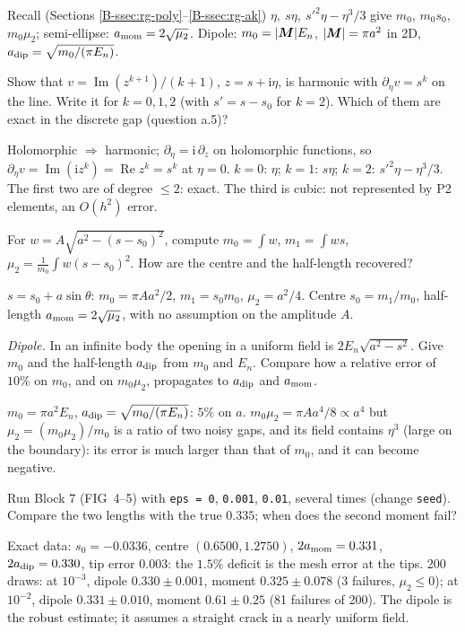 \begin{gbox}{Recall (Sections \ref{B-ssec:rg-poly}--\ref{B-ssec:rg-ak})}
$\eta,\ s\eta,\ s'^2\eta-\eta^3/3$ give $m_0$, $m_0s_0$, $m_0\mu_2$; semi-ellipse:
$a_{\rm mom}=2\sqrt{\mu_2}$. Dipole: $m_0=|\bm{M}|E_n$, $|\bm{M}|=\pi a^2$ in 2D,
$a_{\rm dip}=\sqrt{m_0/(\pi E_n)}$.
\end{gbox}

\q Show that $v=\operatorname{Im}(z^{k+1})/(k+1)$, $z=s+\mathrm i\eta$, is
harmonic with $\partial_\eta v=s^k$ on the line. Write it for $k=0,1,2$
(with $s'=s-s_0$ for $k=2$). Which of them are exact in the discrete gap
(question a.5)?
\begin{answer}
Holomorphic $\Rightarrow$ harmonic; $\partial_\eta=\mathrm i\,\partial_z$ on
holomorphic functions, so $\partial_\eta v=\operatorname{Im}(\mathrm i z^k)=
\operatorname{Re}z^k=s^k$ at $\eta=0$. $k=0$: $\eta$; $k=1$: $s\eta$; $k=2$:
$s'^2\eta-\eta^3/3$. The first two are of degree $\le2$: exact. The third
is cubic: not represented by P2 elements, an $O(h^2)$ error.
\end{answer}

\q For $w=A\sqrt{a^2-(s-s_0)^2}$, compute $m_0=\int w$, $m_1=\int ws$,
$\mu_2=\frac1{m_0}\int w(s-s_0)^2$. How are the centre and the half-length
recovered?
\begin{answer}
$s=s_0+a\sin\theta$: $m_0=\pi Aa^2/2$, $m_1=s_0m_0$, $\mu_2=a^2/4$. Centre
$s_0=m_1/m_0$, half-length $a_{\rm mom}=2\sqrt{\mu_2}$, with no assumption on
the amplitude $A$.
\end{answer}

\q \emph{Dipole.} In an infinite body the opening in a uniform field is
$2E_n\sqrt{a^2-s^2}$. Give $m_0$ and the half-length $a_{\rm dip}$ from
$m_0$ and $E_n$. Compare how a relative error of $10\%$ on $m_0$, and on
$m_0\mu_2$, propagates to $a_{\rm dip}$ and $a_{\rm mom}$.
\begin{answer}
$m_0=\pi a^2E_n$, $a_{\rm dip}=\sqrt{m_0/(\pi E_n)}$: $5\%$ on $a$.
$m_0\mu_2=\pi Aa^4/8\propto a^4$ but $\mu_2=(m_0\mu_2)/m_0$ is a ratio of
two noisy gaps, and its field contains $\eta^3$ (large on the boundary):
its error is much larger than that of $m_0$, and it can become negative.
\end{answer}

\qc Run Block 7 (FIG~4--5) with \texttt{eps = 0}, \texttt{0.001},
\texttt{0.01}, several times (change \texttt{seed}). Compare the two lengths
with the true $0.335$; when does the second moment fail?
\begin{answer}
Exact data: $s_0=-0.0336$, centre $(0.6500,1.2750)$, $2a_{\rm mom}=0.331$,
$2a_{\rm dip}=0.330$, tip error $0.003$: the $1.5\%$ deficit is the mesh
error at the tips. 200 draws: at $10^{-3}$, dipole $0.330\pm0.001$, moment
$0.325\pm0.078$ (3 failures, $\mu_2\le0$); at $10^{-2}$, dipole
$0.331\pm0.010$, moment $0.61\pm0.25$ (81 failures of 200). The dipole is
the robust estimate; it assumes a straight crack in a nearly uniform field.
\end{answer}

